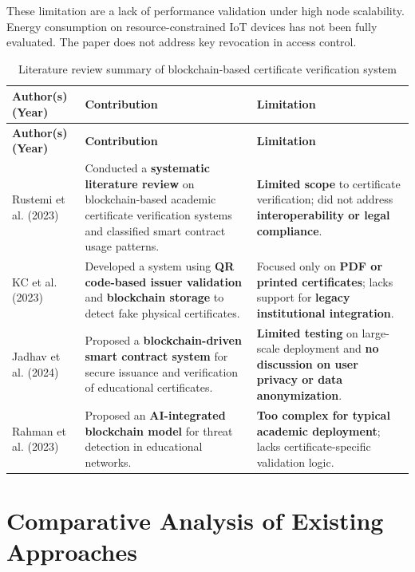 These limitation are a lack of performance validation under high node scalability. Energy consumption on resource-constrained IoT devices has not been fully evaluated. The paper does not address key revocation in access control.




\begin{longtable}{|p{3cm}|p{7cm}|p{5.0cm}|}
\caption{Literature review summary of blockchain-based certificate verification system} \\
\hline
\textbf{Author(s) (Year)} & \textbf{Contribution} & \textbf{Limitation} \\
\hline
\endfirsthead

\hline
\textbf{Author(s) (Year)} & \textbf{Contribution} & \textbf{Limitation} \\
\hline
\endhead

\hline
\endfoot

Rustemi et al. (2023) \cite{Rustemi2023} & Conducted a \textbf{systematic literature review} on blockchain-based academic certificate verification systems and classified smart contract usage patterns. & \textbf{Limited scope} to certificate verification; did not address \textbf{interoperability or legal compliance}. \\
\hline
KC et al. (2023) \cite{Aloqaily2020} & Developed a system using \textbf{QR code-based issuer validation} and \textbf{blockchain storage} to detect fake physical certificates. & Focused only on \textbf{PDF or printed certificates}; lacks support for \textbf{legacy institutional integration}. \\
\hline
Jadhav et al. (2024) \cite{Ankit2023} & Proposed a \textbf{blockchain-driven smart contract system} for secure issuance and verification of educational certificates. & \textbf{Limited testing} on large-scale deployment and \textbf{no discussion on user privacy or data anonymization}. \\
\hline
Rahman et al. (2023) \cite{Rahman2023} & Proposed an \textbf{AI-integrated blockchain model} for threat detection in educational networks. & \textbf{Too complex for typical academic deployment}; lacks certificate-specific validation logic. \\
\hline

\end{longtable}








\section{Comparative Analysis of Existing Approaches}

